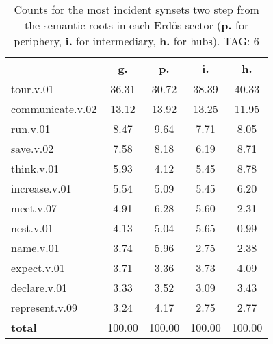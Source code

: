 \begin{table}[h!]
\begin{center}
\begin{tabular}{| l || c | c | c | c |}\hline
 & {\bf g.} & {\bf p.} & {\bf i.} & {\bf h.} \\\hline\hline
tour.v.01 & 36.31  & 30.72  & 38.39  & 40.33 \\\hline
communicate.v.02 & 13.12  & 13.92  & 13.25  & 11.95 \\\hline
run.v.01 & 8.47  & 9.64  & 7.71  & 8.05 \\\hline
save.v.02 & 7.58  & 8.18  & 6.19  & 8.71 \\\hline
think.v.01 & 5.93  & 4.12  & 5.45  & 8.78 \\\hline
increase.v.01 & 5.54  & 5.09  & 5.45  & 6.20 \\\hline
meet.v.07 & 4.91  & 6.28  & 5.60  & 2.31 \\\hline
nest.v.01 & 4.13  & 5.04  & 5.65  & 0.99 \\\hline
name.v.01 & 3.74  & 5.96  & 2.75  & 2.38 \\\hline
expect.v.01 & 3.71  & 3.36  & 3.73  & 4.09 \\\hline
declare.v.01 & 3.33  & 3.52  & 3.09  & 3.43 \\\hline
represent.v.09 & 3.24  & 4.17  & 2.75  & 2.77 \\\hline\hline
{{\bf total}} & 100.00  & 100.00  & 100.00  & 100.00 \\\hline
\end{tabular}
\caption{Counts for the most incident synsets two step from the semantic roots in each Erd\"os sector ({\bf p.} for periphery, {\bf i.} for intermediary, {\bf h.} for hubs). TAG: 6}
\end{center}
\end{table}